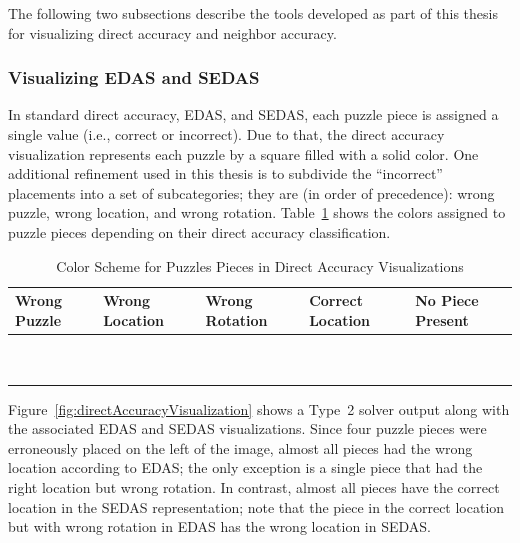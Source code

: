 The following two subsections describe the tools developed as part of this thesis for visualizing direct accuracy and neighbor accuracy.

\subsubsection{Visualizing EDAS and SEDAS}\label{sec:visualizingEdasSedas}

In standard direct accuracy, EDAS, and SEDAS, each puzzle piece is assigned a single value (i.e., correct or incorrect).  Due to that, the direct accuracy visualization represents each puzzle by a square filled with a solid color.  One additional refinement used in this thesis is to subdivide the ``incorrect'' placements into a set of subcategories; they are (in order of precedence): wrong puzzle, wrong location, and wrong rotation.  Table~\ref{tab:directAccuracyColors} shows the colors assigned to puzzle pieces depending on their direct accuracy classification.

\begin{table}[htb]
	\begin{center}
  		\begin{tabular}{ | >{\centering\arraybackslash}m{0.9in} | >{\centering\arraybackslash}m{0.9in} | >{\centering\arraybackslash}m{0.9in} | >{\centering\arraybackslash}m{0.9in} | >{\centering\arraybackslash}m{0.9in} | }
 \hline
    		Wrong Puzzle & Wrong Location & Wrong Rotation & Correct Location  & No Piece Present  \\ \hline
			{\cellcolor{blue}~} & {\cellcolor{red}~}  & {\cellcolor{orange}~}  & {\cellcolor{green}~} & {\cellcolor{black}~}  \\
			{\cellcolor{blue}~} & {\cellcolor{red}~}  & {\cellcolor{orange}~}  & {\cellcolor{green}~} & {\cellcolor{black}~} \\
 \hline
		\end{tabular}
	\end{center}
\caption{Color Scheme for Puzzles Pieces in Direct Accuracy Visualizations}\label{tab:directAccuracyColors}
\end{table}

Figure~\ref{fig:directAccuracyVisualization} shows a Type~2 solver output along with the associated EDAS and SEDAS visualizations. Since four puzzle pieces were erroneously placed on the left of the image, almost all pieces had the wrong location according to EDAS; the only exception is a single piece that had the right location but wrong rotation.  In contrast, almost all pieces have the correct location in the SEDAS representation; note that the piece in the correct location but with wrong rotation in EDAS has the wrong location in SEDAS.


